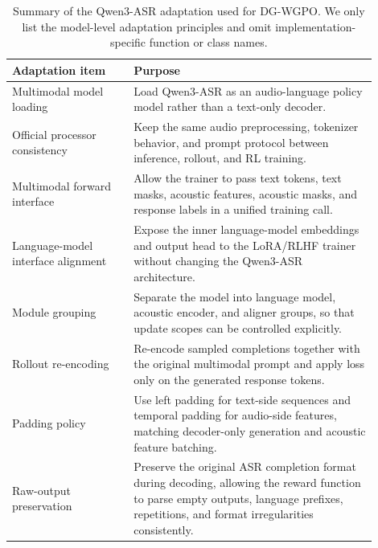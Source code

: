 \documentclass{llmxive}
\begin{document}
\begin{table}[t]
\centering
\small
\begin{tabular}{p{0.30\linewidth} p{0.60\linewidth}}
\toprule
\textbf{Adaptation item} & \textbf{Purpose} \\
\midrule
Multimodal model loading
& Load Qwen3-ASR as an audio-language policy model rather than a text-only
decoder. \\

Official processor consistency
& Keep the same audio preprocessing, tokenizer behavior, and prompt protocol
between inference, rollout, and RL training. \\

Multimodal forward interface
& Allow the trainer to pass text tokens, text masks, acoustic features, acoustic
masks, and response labels in a unified training call. \\

Language-model interface alignment
& Expose the inner language-model embeddings and output head to the LoRA/RLHF
trainer without changing the Qwen3-ASR architecture. \\

Module grouping
& Separate the model into language model, acoustic encoder, and aligner groups,
so that update scopes can be controlled explicitly. \\

Rollout re-encoding
& Re-encode sampled completions together with the original multimodal prompt and
apply loss only on the generated response tokens. \\

Padding policy
& Use left padding for text-side sequences and temporal padding for audio-side
features, matching decoder-only generation and acoustic feature batching. \\

Raw-output preservation
& Preserve the original ASR completion format during decoding, allowing the
reward function to parse empty outputs, language prefixes, repetitions, and
format irregularities consistently. \\
\bottomrule
\end{tabular}
\vspace{-2mm}
\caption{
Summary of the Qwen3-ASR adaptation used for DG-WGPO. We only list the
model-level adaptation principles and omit implementation-specific function or
class names.
}
\label{tab:dg_wgpo_asr_adaptation}
\end{table}
\end{document}
